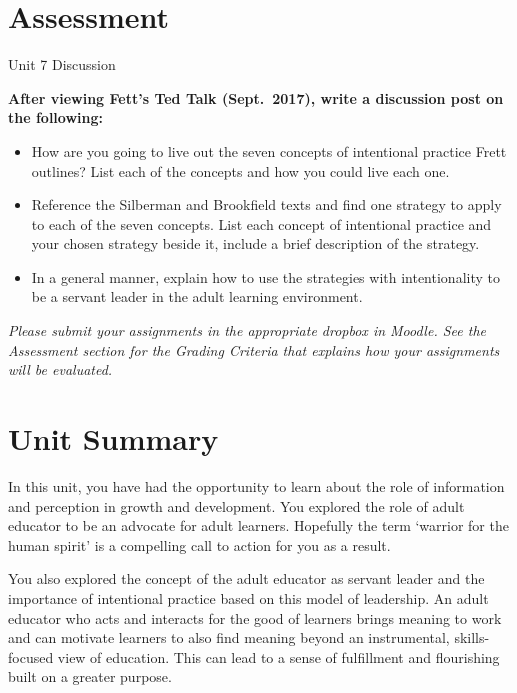 \documentclass[
]{book}
\providecommand{\tightlist}{%
  \setlength{\itemsep}{0pt}\setlength{\parskip}{0pt}}
\begin{document}
\hypertarget{assessment-6}{%
\section*{Assessment}\label{assessment-6}}

\begin{assessment}
{Unit 7 Discussion}

\textbf{After viewing Fett's Ted Talk (Sept.~2017), write a discussion
post on the following:}

\begin{itemize}
\tightlist
\item
  How are you going to live out the seven concepts of intentional
  practice Frett outlines? List each of the concepts and how you could
  live each one.\\
\item
  Reference the Silberman and Brookfield texts and find one strategy to
  apply to each of the seven concepts. List each concept of intentional
  practice and your chosen strategy beside it, include a brief
  description of the strategy.\\
\item
  In a general manner, explain how to use the strategies with
  intentionality to be a servant leader in the adult learning
  environment. ~
\end{itemize}
\end{assessment}

\begin{caution}
\emph{Please submit your assignments in the appropriate dropbox in
Moodle. See the Assessment section for the Grading Criteria that
explains how your assignments will be evaluated.}
\end{caution}

\hypertarget{unit-summary}{%
\section*{Unit Summary}\label{unit-summary}}

In this unit, you have had the opportunity to learn about the role of information and perception in growth and development. You explored the role of adult educator to be an advocate for adult learners. Hopefully the term `warrior for the human spirit' is a compelling call to action for you as a result.

You also explored the concept of the adult educator as servant leader and the importance of intentional practice based on this model of leadership. An adult educator who acts and interacts for the good of learners brings meaning to work and can motivate learners to also find meaning beyond an instrumental, skills-focused view of education. This can lead to a sense of fulfillment and flourishing built on a greater purpose.
\end{document}
